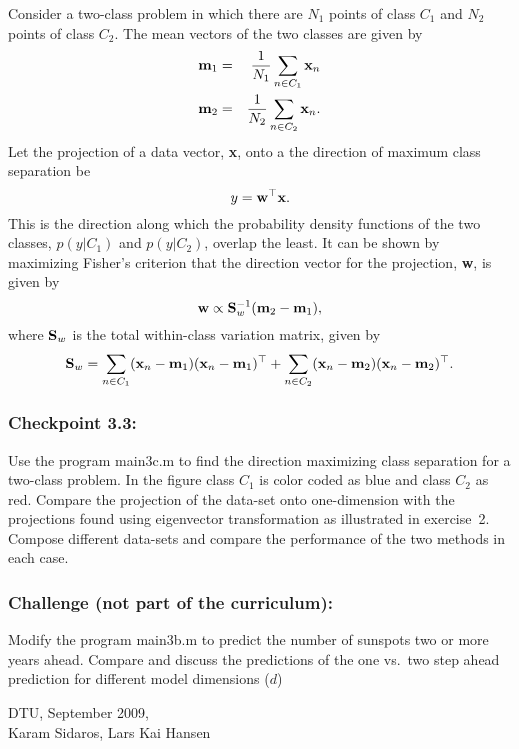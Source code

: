 \documentclass[times,12pt]{article}    %
\def\x{{\bf x}}
\def\w{{\bf w}}
\def\S{{\bf S}}
\def\m{{\bf m}}
\begin{document}
Consider a two-class problem in which there are $N_1$ points of class
$C_1$ and $N_2$ points of class $C_2$. The mean vectors of the two
classes are given by
\begin{eqnarray}
  \label{eq:m1}
  \m_1 &=& \frac{1}{N_1} \sum_{n\in C_1} \x_n\\
  \m_2 &=& \frac{1}{N_2} \sum_{n\in C_2} \x_n.
\end{eqnarray}
Let the projection of a data vector, \x, onto a the direction of
maximum class separation be
\begin{equation}
  \label{eq:fisher1}
  y=\w^\top\x.
\end{equation}
This is the direction along which the probability density
functions of the two classes, $p(y|C_1)$ and $p(y|C_2)$, overlap
the least. It can be shown by maximizing Fisher's criterion  that
the direction vector for the projection, \w, is given by
\begin{equation}
  \label{eq:wsol}
  \w \propto \S_w^{-1}(\m_2 -\m_1),
\end{equation}
where $\S_w$ is the total within-class variation matrix, given by
\begin{equation}
  \label{eq:Sw}
  \S_w = \sum_{n\in C_1} (\x_n-\m_1)(\x_n -\m_1)^\top +
         \sum_{n\in C_2} (\x_n-\m_2)(\x_n -\m_2)^\top.
\end{equation}

\subsubsection*{Checkpoint 3.3:}
Use the program {\sf main3c.m} to find the direction maximizing class
separation for a two-class problem. In the figure class $C_1$ is color coded as blue and class $C_2$ as red. Compare the projection of the
data-set onto one-dimension with the projections found using
eigenvector transformation as illustrated in exercise~2. Compose
different data-sets and compare the performance of the two methods in
each case.

\subsubsection*{Challenge (not part of the curriculum):}
Modify the program {\sf main3b.m} to predict the number of sunspots two
or more years ahead. Compare and discuss the predictions of the one vs.\ two step ahead prediction for different model dimensions ($d$)



\vspace*{2cm}
\noindent DTU, September 2009,\\[2mm]
Karam Sidaros, Lars Kai Hansen
\end{document}
